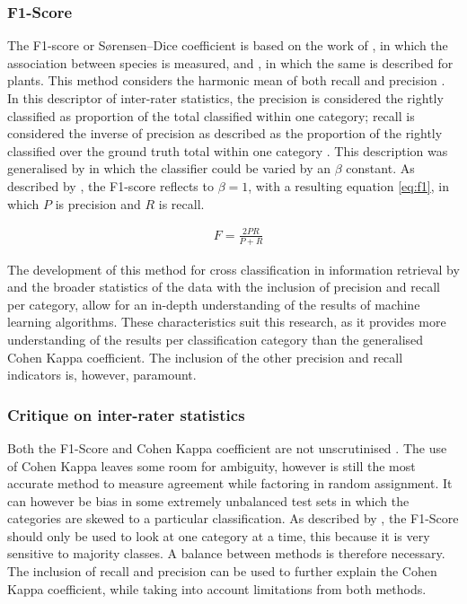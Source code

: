 \subsubsection*{F1-Score}
The F1-score or Sørensen–Dice coefficient is based on the work of \citet{Dice1945}, in which the association between species is measured, and \citet{Sorensen1948}, in which the same is described for plants. This method considers the harmonic mean of both recall and precision \citep{Sasaki2007}. In this descriptor of inter-rater statistics, the precision is considered the rightly classified as proportion of the total classified within one category; recall is considered the inverse of precision as described as the proportion of the rightly classified over the ground truth total within one category \citep{Buckland1994}. This description was generalised by \citet{Chinchor1991} in which the classifier could be varied by an $\beta$ constant. As described by \citet{Sasaki2007}, the F1-score reflects to $\beta = 1$, with a resulting equation \ref{eq:f1}, in which $P$ is precision and $R$ is recall.

\begin{equation}
\begin{split}
&F=\frac{2PR}{P+R}
\end{split}
\label{eq:f1}
\end{equation}

\noindent The development of this method for cross classification in information retrieval by \cite{Chinchor1991} and the broader statistics of the data with the inclusion of precision and recall per category, allow for an in-depth understanding of the results of machine learning algorithms. These characteristics suit this research, as it provides more understanding of the results per classification category than the generalised Cohen Kappa coefficient. The inclusion of the other precision and recall indicators is, however, paramount.

\subsubsection*{Critique on inter-rater statistics}
Both the F1-Score and Cohen Kappa coefficient are not unscrutinised \citep{Feinstein1990, Pontius2011, Powers2015}. The use of Cohen Kappa leaves some room for ambiguity, however is still the most accurate method to measure agreement while factoring in random assignment. It can however be bias in some extremely unbalanced test sets in which the categories are skewed to a particular classification. As described by \citet{Powers2015}, the F1-Score should only be used to look at one category at a time, this because it is very sensitive to majority classes. A balance between methods is therefore necessary. The inclusion of recall and precision can be used to further explain the Cohen Kappa coefficient, while taking into account limitations from both methods.